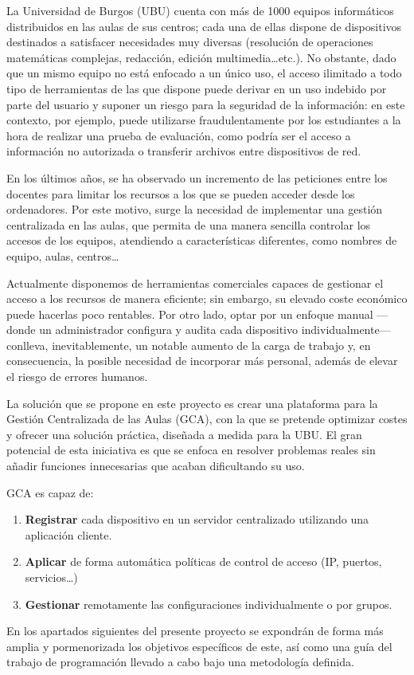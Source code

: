 
La Universidad de Burgos (UBU) cuenta con más de 1000 equipos informáticos distribuidos en las aulas de sus centros;
cada una de ellas dispone de dispositivos destinados a satisfacer necesidades muy diversas (resolución de operaciones
matemáticas complejas, redacción, edición multimedia\ldots etc.).
No obstante, dado que un mismo equipo no está enfocado a un único uso, el acceso ilimitado a todo tipo de herramientas
de las que dispone puede derivar en un uso indebido por parte del usuario y suponer un riesgo para la seguridad de la
información: en este contexto, por ejemplo, puede utilizarse fraudulentamente por los estudiantes a la hora de
realizar una prueba de evaluación, como podría ser el acceso a información no autorizada o transferir archivos entre
dispositivos de red.

En los últimos años, se ha observado un incremento de las peticiones entre los docentes para limitar los recursos a
los que se pueden acceder desde los ordenadores.
Por este motivo, surge la necesidad de implementar una gestión centralizada en las aulas, que permita de una manera
sencilla controlar los accesos de los equipos, atendiendo a características diferentes, como nombres de equipo, aulas,
centros\ldots

Actualmente disponemos de herramientas comerciales capaces de gestionar el acceso a los recursos de manera eficiente;
sin embargo, su elevado coste económico puede hacerlas poco rentables.
Por otro lado, optar por un enfoque manual —donde un
administrador configura y audita cada dispositivo individualmente— conlleva, inevitablemente, un notable aumento de
la carga de trabajo y, en consecuencia, la posible necesidad de incorporar más personal, además de elevar el riesgo
de errores humanos.

La solución que se propone en este proyecto es crear una plataforma para la Gestión Centralizada de las Aulas (GCA),
con la que se pretende optimizar costes y ofrecer una solución práctica, diseñada a medida para la UBU\@.
El gran potencial de esta iniciativa es que se enfoca en resolver problemas reales sin añadir funciones
innecesarias que acaban dificultando su uso.

GCA es capaz de:
\begin{enumerate}
    \item \textbf{Registrar} cada dispositivo en un servidor centralizado utilizando una aplicación cliente.
    \item \textbf{Aplicar} de forma automática políticas de control de acceso (IP, puertos, servicios\ldots)
    \item \textbf{Gestionar} remotamente las configuraciones individualmente o por grupos.
\end{enumerate}

En los apartados siguientes del presente proyecto se expondrán de forma más amplia y pormenorizada los objetivos
específicos de este, así como una guía del trabajo de programación llevado a cabo bajo una metodología definida.


